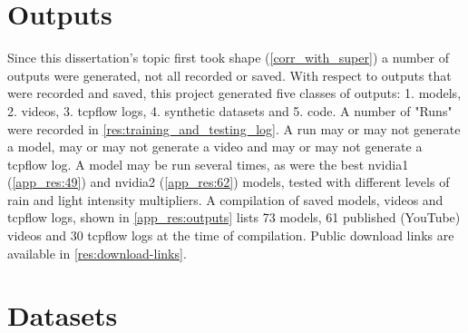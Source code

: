 
\section{Outputs}
Since this dissertation's topic first took shape (\ref{corr_with_super}) a number of outputs were generated, not all recorded or saved. With respect to outputs that were recorded and saved, this project generated five classes of outputs: 1. models, 2. videos, 3. tcpflow logs, 4. synthetic datasets and 5. code. A number of "Runs" were recorded in \ref{res:training_and_testing_log}. A run may or may not generate a model, may or may not generate a video and may or may not generate a tcpflow log. A model may be run several times, as were the best nvidia1 (\ref{app_res:49}) and nvidia2 (\ref{app_res:62}) models, tested with different levels of rain and light intensity multipliers.
A compilation of saved models, videos and tcpflow logs, shown in \ref{app_res:outputs} lists 73 models, 61 published (YouTube) videos and 30 tcpflow logs at the time of compilation. Public download links are available in \ref{res:download-links}.


\section{Datasets}


